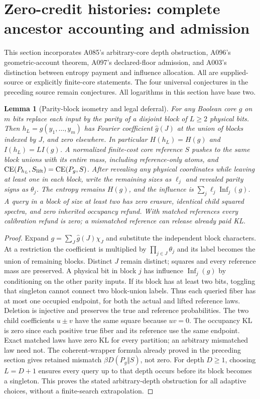 \documentclass[11pt]{article}
\newtheorem{lemma}{Lemma}
\begin{document}
\section{Zero-credit histories: complete ancestor accounting and admission}
This section incorporates A085's arbitrary-core depth obstruction,
A096's geometric-account theorem, A097's declared-floor admission, and
A003's distinction between entropy payment and influence allocation.
All are supplied-source or explicitly finite-core statements. The four
universal conjectures in the preceding source remain conjectures. All
logarithms in this section have base two.

\begin{lemma}[Parity-block isometry and legal deferral]\label{lem:v10lift}
For any Boolean core $g$ on $m$ bits replace each input by the parity of a
disjoint block of $L\ge2$ physical bits. Then $h_L=g(y_1,\ldots,y_m)$ has
Fourier coefficient $\widehat g(J)$ at the union of blocks indexed by $J$,
and zero elsewhere. In particular $H(h_L)=H(g)$ and $I(h_L)=LI(g)$.
A normalized finite-cost core reference $S$ pushes to the same block
unions with its entire mass, including reference-only atoms, and
$\operatorname{CE}(P_{h_L},S_{\rm lift})=\operatorname{CE}(P_g,S)$.
After revealing any physical coordinates while leaving at least one in
each block, write the remaining sizes as $\ell_j$ and revealed parity
signs as $\theta_j$. The entropy remains $H(g)$, and the influence is
$\sum_j\ell_j\operatorname{Inf}_j(g)$. A query in a block of size at least
two has zero erasure, identical child squared spectra, and zero inherited
occupancy refund. With matched references every calibration refund is
zero; a mismatched reference can release already paid KL.
\end{lemma}
\begin{proof}
Expand $g=\sum_J\widehat g(J)\chi_J$ and substitute the independent block
characters. At a restriction the coefficient is multiplied by
$\prod_{j\in J}\theta_j$ and its label becomes the union of remaining
blocks. Distinct $J$ remain distinct; squares and every reference mass
are preserved. A physical bit in block $j$ has influence
$\operatorname{Inf}_j(g)$ by conditioning on the other parity inputs.
If its block has at least two bits, toggling that singleton cannot connect
two block-union labels. Thus each queried fiber has at most one occupied
endpoint, for both the actual and lifted reference laws. Deletion is
injective and preserves the true and reference probabilities. The two
child coefficients $u\pm v$ have the same square because $uv=0$.
The occupancy KL is zero since each positive true fiber and its reference
use the same endpoint. Exact matched laws have zero KL for every
partition; an arbitrary mismatched law need not. The coherent-wrapper
formula already proved in the preceding section gives retained mismatch
$\beta D(P_g\Vert S)$, not zero. For depth $D\ge1$, choosing $L=D+1$
ensures every query up to that depth occurs before its block becomes a
singleton. This proves the stated arbitrary-depth obstruction for all
adaptive choices, without a finite-search extrapolation.
\end{proof}
\end{document}
